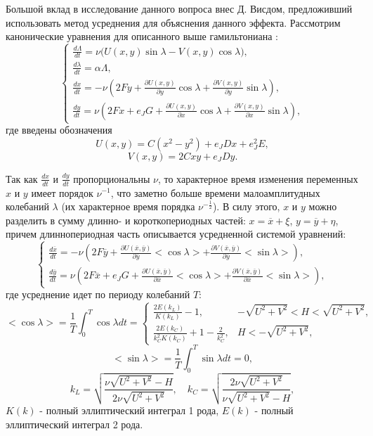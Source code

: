 Большой вклад в исследование данного вопроса внес Д. Висдом, предложивший использовать метод усреднения для объяснения данного эффекта. Рассмотрим канонические уравнения для описанного выше гамильтониана \cite{wis1}:
\begin{equation}
    \begin{cases}
        \frac{d \Lambda}{dt} = \nu \big( U(x,y) \sin \lambda - V(x,y) \cos \lambda \big), \\
        \frac{d \lambda}{dt} = \alpha \Lambda,\\
        \frac{dx}{dt} = -\nu \left(2Fy+\frac{\partial U(x,y)}{\partial y} \cos \lambda + \frac{\partial V(x,y)}{\partial y} \sin \lambda \right), \\
        \frac{dy}{dt} = \nu \left( 2Fx+e_JG +\frac{\partial U(x,y)}{\partial x} \cos \lambda + \frac{\partial V(x,y)}{\partial x} \sin \lambda \right),
    \end{cases}
    \label{sys2}
\end{equation}
где введены обозначения
$$U(x,y) = C(x^2-y^2)+e_J Dx +e_J^2E,$$
$$V(x,y) = 2Cxy+e_JDy.$$

Так как $\frac{dx}{dt}$ и $\frac{dy}{dt}$ пропорциональны $\nu$, то характерное время изменения переменных $x$ и $y$ имеет порядок $\nu^{-1}$, что заметно больше времени малоамплитудных колебаний $\lambda$ (их характерное время порядка $\nu^{-\frac12}$). В силу этого, $x$ и $y$ можно разделить в сумму длинно- и короткопериодных частей: $x=\overline x + \xi$, $y=\overline y + \eta$, причем длиннопериодная часть описывается усредненной системой уравнений:
\begin{equation}
    \begin{cases}
        \frac{d \overline x}{dt} = -\nu \left( 2F \overline y+\frac{\partial U(\overline x,\overline y)}{\partial \overline y} <\cos \lambda> + \frac{\partial V(\overline x,\overline y)}{\partial \overline y} <\sin \lambda> \right), \\
        \frac{d \overline y}{dt} = \nu \left( 2F \overline x+e_JG +\frac{\partial U(\overline x,\overline y)}{\partial \overline x} <\cos \lambda> + \frac{\partial V(\overline x,\overline y)}{\partial \overline x} <\sin \lambda> \right),
    \end{cases}
\end{equation}
где усреднение идет по периоду колебаний $T$:
$$<\cos \lambda>= \frac{1}{T} \int_0^T \cos \lambda dt = 
    \begin{cases} 
        \frac{2E(k_L)}{K(k_L)} - 1, &  -\sqrt{U^2+V^2} < H < \sqrt{U^2+V^2},\\
        \frac{2E(k_C)}{k_C^2 K(k_C)} + 1 - \frac{2}{k_C^2}, & H < -\sqrt{U^2+V^2},
    \end{cases}$$
$$<\sin \lambda>= \frac{1}{T} \int_0^T \sin \lambda dt = 0,$$
$$
k_L = \sqrt{\frac{\nu \sqrt{U^2+V^2} - H}{2 \nu \sqrt{U^2+V^2}}},\quad
k_C = \sqrt{\frac{2 \nu \sqrt{U^2+V^2}}{\nu \sqrt{U^2+V^2} - H}},
$$
$K(k)$ - полный эллиптический интеграл 1 рода,
$E(k)$ - полный эллиптический интеграл 2 рода.

